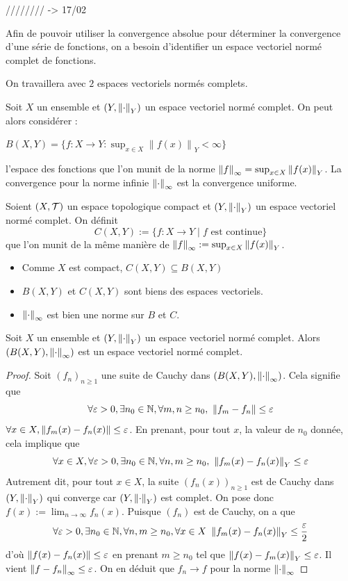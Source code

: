 //////// -> 17/02

Afin de pouvoir utiliser la convergence absolue pour déterminer la convergence d'une série de fonctions, on a besoin d'identifier un espace vectoriel normé complet de fonctions.


On travaillera avec $2$ espaces vectoriels normés complets.

\begin{definition}
    Soit $X$ un ensemble et $(Y,\left\| \cdot \right\| _Y)$ un espace vectoriel normé complet. On peut alors considérer : 

    $B(X,Y) = \{f:X \to Y : \sup_{x\in X}\left\lVert f(x)\right\rVert_Y < \infty\}$


l'espace des fonctions que l'on munit de la norme $\left\| f \right\|_\infty = \sup_{x\in X}\left\lVert f(x)\right\rVert_Y$.
La convergence pour la norme infinie $\left\| \cdot \right\|_\infty$ est la convergence uniforme.
\end{definition}
\begin{definition}
    Soient $(X,\mathcal{T})$ un espace topologique compact et $(Y,\left\| \cdot \right\|_Y)$ un espace vectoriel normé complet. On définit $$C(X,Y):=\{f:X\to Y\mid f \text{ est continue}\}$$ que l'on munit de la même manière de $\left\| f \right\| _{\infty}:=\sup_{x\in X}\left\| f(x) \right\|_Y$. 
\end{definition}

\begin{remarque}
\begin{itemize}
    \item Comme $X$ est compact, $C(X,Y)\subseteq B(X,Y)$
    \item $B(X,Y)$ et $C(X,Y)$ sont biens des espaces vectoriels.
    \item $\left\| \cdot \right\|_\infty$ est bien une norme sur $B$ et $C$.
\end{itemize}
\end{remarque}
\begin{proposition}
    Soit $X$ un ensemble et $(Y,\left\| \cdot \right\| _Y)$ un espace vectoriel normé complet. Alors $(B(X,Y),\left\| \cdot \right\|_\infty)$ est un espace vectoriel normé complet.
\end{proposition}
\begin{proof}
    Soit $(f_n)_{n\ge 1}$ une suite de Cauchy dans $(B(X,Y), \left\| \cdot \right\|_\infty)$. Cela signifie que $$\forall \varepsilon>0, \exists n_0\in \mathbb{N}, \forall m,n\ge n_0,\ \left\| f_m-f_n \right\|\le \varepsilon$$
    \ie $\forall x\in X, \left\| f_m(x)-f_n(x) \right\|\le \varepsilon$. En prenant, pour tout $x$, la valeur de $n_0$ donnée, cela implique que $$\forall x\in X,\forall \varepsilon >0,\exists n_0\in \N,\forall n,m\ge n_0,\ \norm{f_m(x) - f_n(x)}_Y\le \varepsilon$$
    Autrement dit, pour tout $x\in X$, la suite $(f_n(x))_{n\ge 1}$ est de Cauchy dans $(Y,\left\| \cdot \right\|_Y)$ qui converge car $(Y,\left\| \cdot \right\|_Y)$ est complet. On pose donc $f(x) :=\lim_{n\to\infty}f_n(x)$. Puisque $(f_n)$ est de Cauchy, on a que $$\forall \varepsilon >0,\exists n_0\in \mathbb{N},\forall n,m\ge n_0,\forall x\in X \ \left\| f_m(x) - f_n(x) \right\|_Y\le \frac\varepsilon2$$ d'où $\left\| f(x)-f_n(x) \right\|\le \varepsilon$ en prenant $m\ge n_0$ tel que $\left\| f(x)-f_m(x) \right\|_Y\le\varepsilon$. Il vient $\left\| f-f_n \right\|_\infty\le \varepsilon$. On en déduit que $f_n\to f$ pour la norme $\left\| \cdot \right\|_\infty$
\end{proof}

